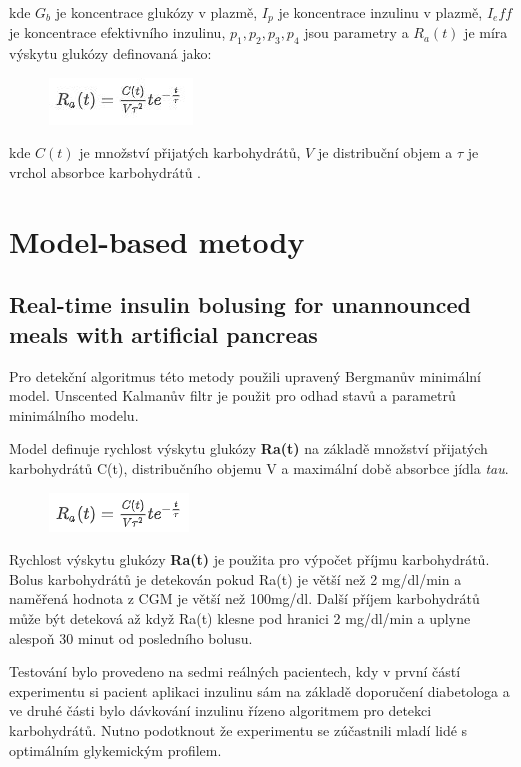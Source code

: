 \noindent kde $G_b$ je koncentrace glukózy v plazmě, $I_p$ je koncentrace inzulinu v plazmě, $I_eff$ je koncentrace efektivního inzulinu, $p_1, p_2, p_3, p_4$ jsou parametry a $R_a (t)$ je míra výskytu glukózy definovaná jako:

\begin{figure}[H]{
\label{fig:bergman2}
\includegraphics{img/analyza/bergman2.jpg}}
\end{figure}

\noindent kde $C(t)$ je množství přijatých karbohydrátů, $V$  je distribuční objem a $\tau$ je vrchol absorbce karbohydrátů \citep{Analyza.Turksoy}.


\section{Model-based metody}
\subsection{Real-time insulin bolusing for unannounced meals with artificial pancreas}
\label{ch:turksoy}

Pro detekční algoritmus této metody použili \citet{Analyza.Turksoy} upravený Bergmanův minimální model. Unscented Kalmanův filtr je použit pro odhad stavů a parametrů minimálního modelu.

Model definuje rychlost výskytu glukózy \textbf{Ra(t)} na základě množství přijatých karbohydrátů C(t), distribučního objemu V a maximální době absorbce jídla \textit{tau}.

\begin{figure}[H]{
\label{fig:turksoy1}
\includegraphics{img/analyza/turksoy1.png}}
\end{figure}

Rychlost výskytu glukózy \textbf{Ra(t)} je použita pro výpočet příjmu karbohydrátů. Bolus karbohydrátů je detekován pokud Ra(t) je větší než 2 mg/dl/min a naměřená hodnota z CGM je větší než 100mg/dl. Další příjem karbohydrátů může být deteková až když Ra(t) klesne pod hranici 2 mg/dl/min a uplyne alespoň 30 minut od posledního bolusu.

Testování bylo provedeno na sedmi reálných pacientech, kdy v první částí experimentu si pacient aplikaci inzulinu sám na základě doporučení diabetologa a ve druhé části bylo dávkování inzulinu řízeno algoritmem pro detekci karbohydrátů. Nutno podotknout že experimentu se zúčastnili mladí lidé s optimálním glykemickým profilem.

